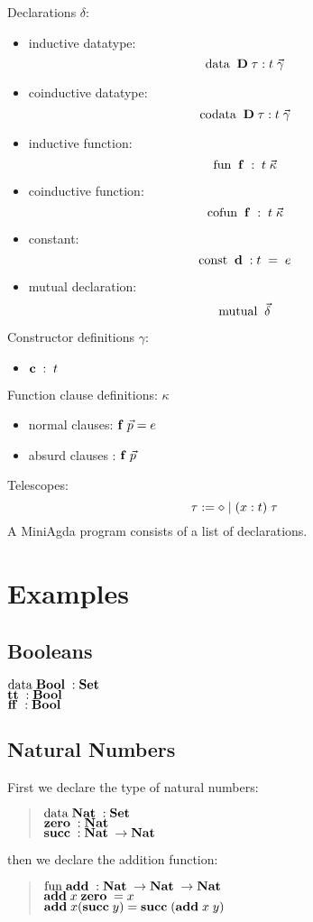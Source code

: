 Declarations $\delta$:
\begin{itemize}
\item
inductive datatype: 
\[\mathrm{data}\; \; \mathbf{D} \; \tau : t \; \vec{\gamma}\]  
\item
coinductive datatype:
\[\mathrm{codata}\; \; \mathbf{D} \; \tau : t \; \vec{\gamma}\]  
\item
inductive function:
\[\mathrm{fun}\; \; \mathbf{f} \; : \; t \; \vec{\kappa}\]
\item
coinductive function:
\[\mathrm{cofun}\; \; \mathbf{f} \; : \; t \; \vec{\kappa}\]
\item
constant:
\[\mathrm{const}\; \;  \mathbf{d} \; : t \; = \; e \]
\item
mutual declaration:
\[\mathrm{mutual}\; \; \vec{\delta}\]
\end{itemize}
Constructor definitions $\gamma$:
\begin{itemize}
\item
$ \mathbf{c} \; : \; t $ 
\end{itemize}
Function clause definitions: $ \kappa $
\begin{itemize}
\item
normal clauses: $ \mathbf{f} \; \vec{p} = e $
\item
absurd clauses : $ \mathbf{f} \; \vec{p} $
\end{itemize}
Telescopes:
\[ \tau := \diamond \;\vert\; ( x : t ) \; \tau \]
A MiniAgda program consists of a list of declarations.
\section{Examples}
\subsection{Booleans}
$\mathrm{data}\; \mathbf{Bool}\; : \mathbf{Set}$ 
\\
$\mathbf{tt}\; : \mathbf{Bool}\; $
\\
$\mathbf{ff}\; : \mathbf{Bool}\; $
\subsection{Natural Numbers}
First we declare the type of natural numbers:
\begin{quote}
$\mathrm{data}\; \mathbf{Nat}\; : \mathbf{Set}$ 
\\
$\mathbf{zero}\; : \mathbf{Nat}\; $
\\
$\mathbf{succ}\; : \mathbf{Nat}\; \rightarrow \mathbf{Nat}\; $
\end{quote}
then we declare the addition function:
\begin{quote}
$\mathrm{fun}\; \mathbf{add}\; : \mathbf{Nat}\; \rightarrow \mathbf{Nat}\; \rightarrow \mathbf{Nat}\;$
\\
$\mathbf{add}\; x \; \mathbf{zero}\; = x $
\\
$\mathbf{add}\; x (\mathbf{succ}\; y) = \mathbf{succ}\; ( \mathbf{add}\; x \; y)  $
\end{quote}

